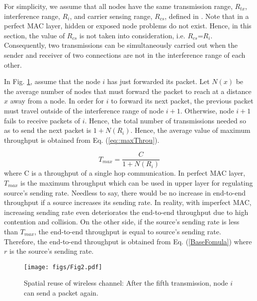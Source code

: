 \documentclass[12pt, draftclsnofoot, onecolumn]{IEEEtran}
\begin{document}
For simplicity, we assume that all nodes have the same transmission range, 
$R_{tx}$, interference range, $R_i$, and carrier sensing range, $R_{cs}$, 
defined in \cite{ref1}. 
Note that in a perfect MAC layer, hidden or exposed node problems do not exist. Hence, in this section, the value of $R_{cs}$ 
is not taken into consideration, i.e. $R_{cs}$=$R_i$. Consequently, two 
transmissions can be simultaneously carried out when the sender and 
receiver of two connections are not in the interference range of each other.

In Fig. \ref{fig2}, assume that the node $i$ has just forwarded 
its packet. Let $N(x)$ be the average number of nodes that 
must forward the packet to reach at a distance $x$ away from 
a node. In order for $i$ to forward its next packet, the previous 
packet must travel outside of the interference range of node $i+1$. 
Otherwise, node $i+1$ fails to receive packets of $i$. Hence, the total 
number of transmissions needed so as to send the next packet is 
$1+N(R_i)$. Hence, the average value of maximum throughput is 
obtained from Eq. (\ref{eq::maxThrou}).

\begin{equation}
\label{eq::maxThrou}
T_{max} = \frac{C}{1+N(R_i)}
\end{equation}
where C is a throughput of a single hop communication. In perfect MAC layer, $T_{max}$ is the maximum 
throughput which can be used in upper layer for regulating source's 
sending rate. Needless to say, there would be no increase in end-to-end 
throughput if a source increases its sending rate. In reality, with 
imperfect MAC, increasing sending rate even deteriorates the end-to-end 
throughput due to high contention and collision. On the other side, if the 
source's sending rate is less than $T_{max}$, the end-to-end throughput 
is equal to source's sending rate. Therefore, the end-to-end throughput is 
obtained from Eq. (\ref{BaseFomula}) where $r$ is the source's sending 
rate.


\begin{figure}
\centering
\texttt{[image: figs/Fig2.pdf]}
\caption{Spatial reuse of wireless channel: After the fifth transmission,
 node $i$ can send a packet again.}
\label{fig2}
\end{figure}
\end{document}
